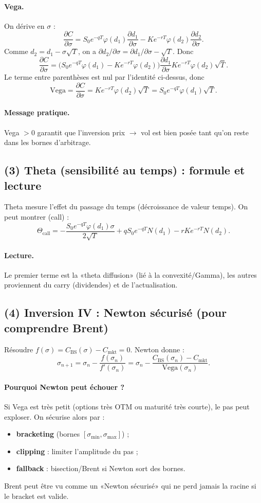 \paragraph{Vega.}
On dérive en $\sigma$ :
\[
\frac{\partial C}{\partial \sigma}
=S_0e^{-qT}\varphi(d_1)\frac{\partial d_1}{\partial \sigma}
-Ke^{-rT}\varphi(d_2)\frac{\partial d_2}{\partial \sigma}.
\]
Comme $d_2=d_1-\sigma\sqrt{T}$, on a $\partial d_2/\partial\sigma=\partial d_1/\partial\sigma-\sqrt{T}$.
Donc
\[
\frac{\partial C}{\partial \sigma}
=\Big(S_0e^{-qT}\varphi(d_1)-Ke^{-rT}\varphi(d_2)\Big)\frac{\partial d_1}{\partial \sigma}
Ke^{-rT}\varphi(d_2)\sqrt{T}.
\]
Le terme entre parenthèses est nul par l'identité ci-dessus, donc
\[
\boxed{\mathrm{Vega}=\frac{\partial C}{\partial \sigma}=Ke^{-rT}\varphi(d_2)\sqrt{T}=S_0e^{-qT}\varphi(d_1)\sqrt{T}.}
\]
\paragraph{Message pratique.}
Vega $>0$ garantit que l'inversion prix $\to$ vol est bien posée tant qu'on reste dans les bornes d'arbitrage.

\subsection*{(3) Theta (sensibilité au temps) : formule et lecture}
Theta mesure l'effet du passage du temps (décroissance de valeur temps).
On peut montrer (call) :
\[
\Theta_{\mathrm{call}}
=-\frac{S_0e^{-qT}\varphi(d_1)\sigma}{2\sqrt{T}} + qS_0e^{-qT}N(d_1)-rKe^{-rT}N(d_2).
\]
\paragraph{Lecture.}
Le premier terme est la «theta diffusion» (lié à la convexité/Gamma), les autres proviennent du carry (dividendes) et de l'actualisation.

\subsection*{(4) Inversion IV : Newton sécurisé (pour comprendre Brent)}
Résoudre $f(\sigma)=C_{\mathrm{BS}}(\sigma)-C_{\mathrm{mkt}}=0$.
Newton donne :
\[
\sigma_{n+1}=\sigma_n-\frac{f(\sigma_n)}{f'(\sigma_n)}
=\sigma_n-\frac{C_{\mathrm{BS}}(\sigma_n)-C_{\mathrm{mkt}}}{\mathrm{Vega}(\sigma_n)}.
\]
\paragraph{Pourquoi Newton peut échouer ?}
Si Vega est très petit (options très OTM ou maturité très courte), le pas peut exploser.
On sécurise alors par :
\begin{itemize}[leftmargin=*]
\item \textbf{bracketing} (bornes $[\sigma_{\min},\sigma_{\max}]$) ;
\item \textbf{clipping} : limiter l'amplitude du pas ;
\item \textbf{fallback} : bisection/Brent si Newton sort des bornes.
\end{itemize}
Brent peut être vu comme un «Newton sécurisé» qui ne perd jamais la racine si le bracket est valide.

